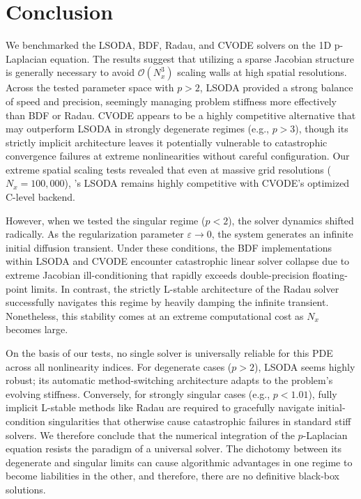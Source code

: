 \section{Conclusion}

We benchmarked the LSODA, BDF, Radau, and CVODE solvers on the 1D p-Laplacian equation. The results suggest that utilizing a sparse Jacobian structure is generally necessary to avoid \(\mathcal{O}(N_x^3)\) scaling walls at high spatial resolutions. Across the tested parameter space with \(p > 2\), LSODA provided a strong balance of speed and precision, seemingly managing problem stiffness more effectively than BDF or Radau. CVODE appears to be a highly competitive alternative that may outperform LSODA in strongly degenerate regimes (e.g., \(p > 3\)), though its strictly implicit architecture leaves it potentially vulnerable to catastrophic convergence failures at extreme nonlinearities without careful configuration. Our extreme spatial scaling tests revealed that even at massive grid resolutions (\(N_x = 100,000\)), 's LSODA remains highly competitive with CVODE's optimized C-level backend.

However, when we tested the singular regime (\(p < 2\)), the solver dynamics shifted radically. As the regularization parameter \(\varepsilon \to 0\), the system generates an infinite initial diffusion transient. Under these conditions, the BDF implementations within LSODA and CVODE encounter catastrophic linear solver collapse due to extreme Jacobian ill-conditioning that rapidly exceeds double-precision floating-point limits. In contrast, the strictly L-stable architecture of the Radau solver successfully navigates this regime by heavily damping the infinite transient. Nonetheless, this stability comes at an extreme computational cost as \(N_x\) becomes large.

On the basis of our tests, no single solver is universally reliable for this PDE across all nonlinearity indices. For degenerate cases (\(p > 2\)), LSODA seems highly robust; its automatic method-switching architecture adapts to the problem's evolving stiffness. Conversely, for strongly singular cases (e.g., \(p < 1.01\)), fully implicit L-stable methods like Radau are required to gracefully navigate initial-condition singularities that otherwise cause catastrophic failures in standard stiff solvers. We therefore conclude that the numerical integration of the \(p\)-Laplacian equation resists the paradigm of a universal solver. The dichotomy between its degenerate and singular limits can cause algorithmic advantages in one regime to become liabilities in the other, and therefore, there are no definitive black-box solutions. 

